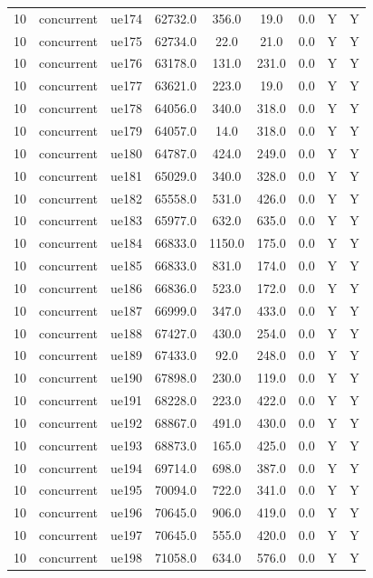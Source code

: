 \begin{table}[ht]
\begin{tabular}{|c|c|c|c|c|c|c|c|c|}
10 & concurrent & ue174 & 62732.0 & 356.0 & 19.0 & 0.0 & Y & Y \\
10 & concurrent & ue175 & 62734.0 & 22.0 & 21.0 & 0.0 & Y & Y \\
10 & concurrent & ue176 & 63178.0 & 131.0 & 231.0 & 0.0 & Y & Y \\
10 & concurrent & ue177 & 63621.0 & 223.0 & 19.0 & 0.0 & Y & Y \\
10 & concurrent & ue178 & 64056.0 & 340.0 & 318.0 & 0.0 & Y & Y \\
10 & concurrent & ue179 & 64057.0 & 14.0 & 318.0 & 0.0 & Y & Y \\
10 & concurrent & ue180 & 64787.0 & 424.0 & 249.0 & 0.0 & Y & Y \\
10 & concurrent & ue181 & 65029.0 & 340.0 & 328.0 & 0.0 & Y & Y \\
10 & concurrent & ue182 & 65558.0 & 531.0 & 426.0 & 0.0 & Y & Y \\
10 & concurrent & ue183 & 65977.0 & 632.0 & 635.0 & 0.0 & Y & Y \\
10 & concurrent & ue184 & 66833.0 & 1150.0 & 175.0 & 0.0 & Y & Y \\
10 & concurrent & ue185 & 66833.0 & 831.0 & 174.0 & 0.0 & Y & Y \\
10 & concurrent & ue186 & 66836.0 & 523.0 & 172.0 & 0.0 & Y & Y \\
10 & concurrent & ue187 & 66999.0 & 347.0 & 433.0 & 0.0 & Y & Y \\
10 & concurrent & ue188 & 67427.0 & 430.0 & 254.0 & 0.0 & Y & Y \\
10 & concurrent & ue189 & 67433.0 & 92.0 & 248.0 & 0.0 & Y & Y \\
10 & concurrent & ue190 & 67898.0 & 230.0 & 119.0 & 0.0 & Y & Y \\
10 & concurrent & ue191 & 68228.0 & 223.0 & 422.0 & 0.0 & Y & Y \\
10 & concurrent & ue192 & 68867.0 & 491.0 & 430.0 & 0.0 & Y & Y \\
10 & concurrent & ue193 & 68873.0 & 165.0 & 425.0 & 0.0 & Y & Y \\
10 & concurrent & ue194 & 69714.0 & 698.0 & 387.0 & 0.0 & Y & Y \\
10 & concurrent & ue195 & 70094.0 & 722.0 & 341.0 & 0.0 & Y & Y \\
10 & concurrent & ue196 & 70645.0 & 906.0 & 419.0 & 0.0 & Y & Y \\
10 & concurrent & ue197 & 70645.0 & 555.0 & 420.0 & 0.0 & Y & Y \\
10 & concurrent & ue198 & 71058.0 & 634.0 & 576.0 & 0.0 & Y & Y \\

\end{tabular}
\end{table}
